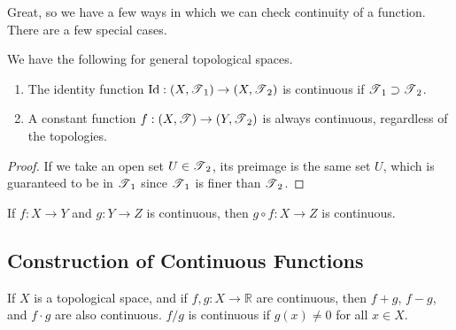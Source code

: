   Great, so we have a few ways in which we can check continuity of a function. There are a few special cases. 

  \begin{lemma}
    We have the following for general topological spaces. 
    \begin{enumerate}
      \item The identity function $\id: (X, \T_1) \rightarrow (X, \T_2)$ is continuous if $\T_1 \supset \T_2$. 
      \item A constant function $f: (X, \T) \rightarrow (Y, \T_2)$ is always continuous, regardless of the topologies. 
    \end{enumerate}
  \end{lemma}
  \begin{proof}
    If we take an open set $U \in \T_2$, its preimage is the same set $U$, which is guaranteed to be in $\T_1$ since $\T_1$ is finer than $\T_2$. 
  \end{proof}

  \begin{lemma}
    If $f: X \rightarrow Y$ and $g: Y \rightarrow Z$ is continuous, then $g \circ f :X \rightarrow Z$ is continuous. 
  \end{lemma}

\subsection{Construction of Continuous Functions} 

  \begin{theorem}
    If $X$ is a topological space, and if $f, g: X \longrightarrow \mathbb{R}$ are continuous, then $f + g$, $f-g$, and $f \cdot g$ are also continuous. $f / g$ is continuous if $g(x) \neq 0$ for all $x \in X$. 
  \end{theorem}

